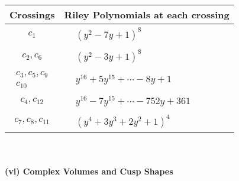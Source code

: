 \documentclass[1p]{elsarticle_modified}
\theoremstyle{definition}
\begin{document}
\begin{tabular}{m{50pt}|m{274pt}}
Crossings & \hspace{64pt}Riley Polynomials at each crossing \\
\hline $$\begin{aligned}c_{1}\end{aligned}$$&$\begin{aligned}
&(y^2-7 y+1)^8
\end{aligned}$\\
\hline $$\begin{aligned}c_{2},c_{6}\end{aligned}$$&$\begin{aligned}
&(y^2-3 y+1)^8
\end{aligned}$\\
\hline $$\begin{aligned}c_{3},c_{5},c_{9}\\c_{10}\end{aligned}$$&$\begin{aligned}
&y^{16}+5 y^{15}+\cdots-8 y+1
\end{aligned}$\\
\hline $$\begin{aligned}c_{4},c_{12}\end{aligned}$$&$\begin{aligned}
&y^{16}-7 y^{15}+\cdots-752 y+361
\end{aligned}$\\
\hline $$\begin{aligned}c_{7},c_{8},c_{11}\end{aligned}$$&$\begin{aligned}
&(y^4+3 y^3+2 y^2+1)^4
\end{aligned}$\\
\hline
\end{tabular}\\~\\
\newpage\flushleft \textbf{(vi) Complex Volumes and Cusp Shapes}
\end{document}
